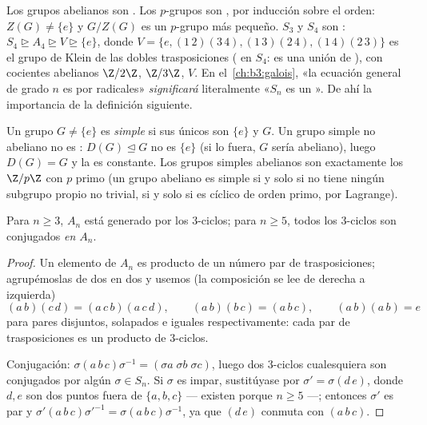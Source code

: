 \begin{example}\label{ex:b3:groups:solvableexamples}
Los grupos abelianos son . Los
$p$-grupos son , por inducción
sobre el orden: $Z(G) \neq \{e\}$ y $G/Z(G)$ es un $p$-grupo más
pequeño. $S_3$ y $S_4$ son :
$S_4 \trianglerighteq A_4
\trianglerighteq V \trianglerighteq \{e\}$, donde $V = \{e,
(1\,2)(3\,4), (1\,3)(2\,4), (1\,4)(2\,3)\}$ es el grupo de Klein de las
dobles trasposiciones ( en $S_4$:
es una unión de ),
con cocientes abelianos $\Z/2\Z$, $\Z/3\Z$, $V$. En
el~\cref{ch:b3:galois}, «la ecuación general de grado $n$ es
 por radicales»
\emph{significará} literalmente «$S_n$ es un
». De ahí la importancia
de la definición siguiente.
\end{example}

\begin{definition}\label{def:b3:groups:simple}
Un grupo $G \neq \{e\}$ es \emph{simple} si sus
únicos  son $\{e\}$ y
$G$. Un grupo simple no abeliano no es
: $D(G) \trianglelefteq G$ no
es $\{e\}$ (si lo fuera, $G$ sería abeliano), luego $D(G) = G$ y la
 es constante. Los grupos
simples abelianos son exactamente los $\Z/p\Z$ con $p$ primo (un grupo
abeliano es simple si y solo si no tiene ningún subgrupo propio no
trivial, si y solo si es cíclico de orden primo, por Lagrange).
\end{definition}

\begin{lemma}\label{lem:b3:groups:threecycles}
Para $n \geq 3$, $A_n$ está generado por los $3$-ciclos; para
$n \geq 5$, todos los $3$-ciclos son conjugados \emph{en $A_n$}.
\end{lemma}

\begin{proof}
Un elemento de $A_n$ es producto de un número par de trasposiciones;
agrupémoslas de dos en dos y usemos (la composición se lee de derecha a
izquierda)
\[
(a\,b)(c\,d) = (a\,c\,b)(a\,c\,d), \qquad
(a\,b)(b\,c) = (a\,b\,c), \qquad
(a\,b)(a\,b) = e
\]
para pares disjuntos, solapados e iguales respectivamente: cada par de
trasposiciones es un producto de $3$-ciclos.

Conjugación: $\sigma(a\,b\,c)\sigma^{-1} = (\sigma a\; \sigma b\;
\sigma c)$, luego dos $3$-ciclos cualesquiera son conjugados por algún
$\sigma \in
S_n$. Si $\sigma$ es impar, sustitúyase por $\sigma' = \sigma (d\,e)$,
donde $d, e$ son dos puntos fuera de $\{a, b, c\}$ --- existen porque
$n \geq 5$ ---; entonces $\sigma'$ es par y $\sigma'(a\,b\,c)
\sigma'^{-1} = \sigma(a\,b\,c)\sigma^{-1}$, ya que $(d\,e)$ conmuta con
$(a\,b\,c)$.
\end{proof}

